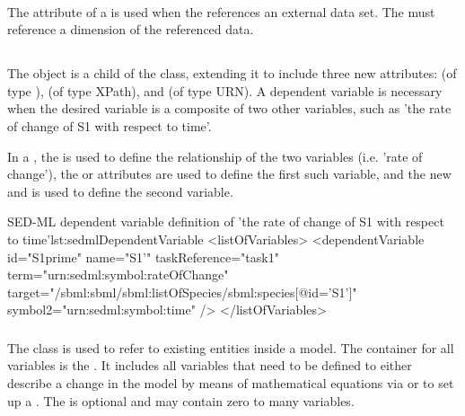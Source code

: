 \begin{blockChanged}
\paragraph*{}
The  attribute of a \RemainingDimension is used when the \Variable references an external data set.  The  must reference a dimension of the referenced data.


\subsection{}
\label{class:dependentVariable}

The \DependentVariable object is a child of the \Variable class, extending it to include three new attributes:   (of type ),  (of type XPath), and  (of type URN).  A dependent variable is necessary when the desired variable is a composite of two other variables, such as 'the rate of change of S1 with respect to time'.

In a \DependentVariable, the  is used to define the relationship of the two variables (i.e. 'rate of change'), the  or  attributes are used to define the first such variable, and the new  and  is used to define the second variable.  

\begin{myXmlLst}{SED-ML dependent variable definition of 'the rate of change of S1 with respect to time'}{lst:sedmlDependentVariable}
<listOfVariables>
	<dependentVariable id="S1prime" name="S1'"  taskReference="task1"
		term="urn:sedml:symbol:rateOfChange"
		target="/sbml:sbml/sbml:listOfSpecies/sbml:species[@id='S1']"
		symbol2="urn:sedml:symbol:time" />
</listOfVariables>
\end{myXmlLst}


\subsubsection{}
\label{sec:listOfVariables}
The \Variable class is used to refer to existing entities inside a model. The container for all variables is the \ListOfVariables. It includes all variables that need to be defined to either describe a change in the model by means of mathematical equations via \ComputeChange or to set up a \DataGenerator. The \ListOfVariables is optional and may contain zero to many variables. 


\end{blockChanged}

